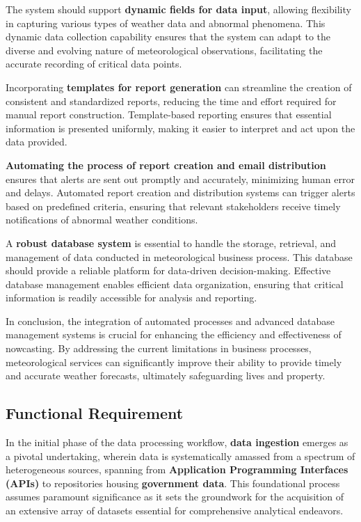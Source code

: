 The system should support \textbf{dynamic fields for data input}, allowing
flexibility in capturing various types of weather data and abnormal phenomena.
This dynamic data collection capability ensures that the system can adapt to the
diverse and evolving nature of meteorological observations, facilitating the
accurate recording of critical data points.

Incorporating \textbf{templates for report generation} can streamline the
creation of consistent and standardized reports, reducing the time and effort
required for manual report construction. Template-based reporting ensures that
essential information is presented uniformly, making it easier to interpret and
act upon the data provided.

\textbf{Automating the process of report creation and email distribution}
ensures that alerts are sent out promptly and accurately, minimizing human error
and delays. Automated report creation and distribution systems can trigger
alerts based on predefined criteria, ensuring that relevant stakeholders receive
timely notifications of abnormal weather conditions.

A \textbf{robust database system} is essential to handle the storage, retrieval,
and management of data conducted in meteorological business process. This
database should provide a reliable platform for data-driven decision-making.
Effective database management enables efficient data organization, ensuring that
critical information is readily accessible for analysis and reporting.

In conclusion, the integration of automated processes and advanced database
management systems is crucial for enhancing the efficiency and effectiveness of
nowcasting. By addressing the current limitations in business processes,
meteorological services can significantly improve their ability to provide
timely and accurate weather forecasts, ultimately safeguarding lives and
property.


\subsection{Functional Requirement}

In the initial phase of the data processing workflow, \textbf{data ingestion}
emerges as a pivotal undertaking, wherein data is systematically amassed from a
spectrum of heterogeneous sources, spanning from \textbf{Application Programming
Interfaces (APIs)} to repositories housing \textbf{government data}. This
foundational process assumes paramount significance as it sets the groundwork
for the acquisition of an extensive array of datasets essential for
comprehensive analytical endeavors.

